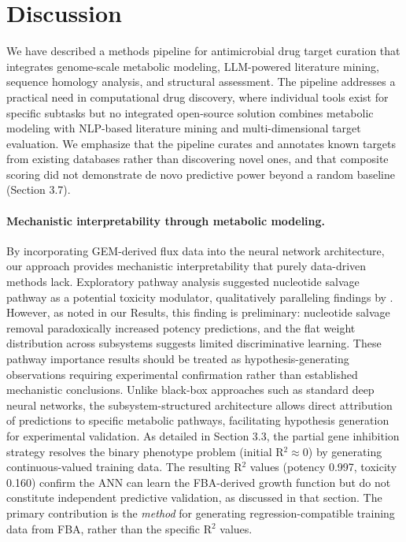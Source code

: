 \documentclass[12pt,a4paper]{article}
\begin{document}
\section{Discussion}

We have described a methods pipeline for antimicrobial drug target curation that integrates genome-scale metabolic modeling, LLM-powered literature mining, sequence homology analysis, and structural assessment. The pipeline addresses a practical need in computational drug discovery, where individual tools exist for specific subtasks but no integrated open-source solution combines metabolic modeling with NLP-based literature mining and multi-dimensional target evaluation. We emphasize that the pipeline curates and annotates known targets from existing databases rather than discovering novel ones, and that composite scoring did not demonstrate de novo predictive power beyond a random baseline (Section 3.7).

\paragraph{Mechanistic interpretability through metabolic modeling.}
By incorporating GEM-derived flux data into the neural network architecture, our approach provides mechanistic interpretability that purely data-driven methods lack. Exploratory pathway analysis suggested nucleotide salvage pathway as a potential toxicity modulator, qualitatively paralleling findings by \citet{arora2026}. However, as noted in our Results, this finding is preliminary: nucleotide salvage removal paradoxically increased potency predictions, and the flat weight distribution across subsystems suggests limited discriminative learning. These pathway importance results should be treated as hypothesis-generating observations requiring experimental confirmation rather than established mechanistic conclusions. Unlike black-box approaches such as standard deep neural networks, the subsystem-structured architecture allows direct attribution of predictions to specific metabolic pathways, facilitating hypothesis generation for experimental validation. As detailed in Section 3.3, the partial gene inhibition strategy resolves the binary phenotype problem (initial R$^2 \approx 0$) by generating continuous-valued training data. The resulting R$^2$ values (potency 0.997, toxicity 0.160) confirm the ANN can learn the FBA-derived growth function but do not constitute independent predictive validation, as discussed in that section. The primary contribution is the \textit{method} for generating regression-compatible training data from FBA, rather than the specific R$^2$ values.
\end{document}
